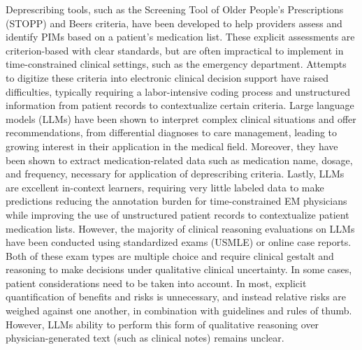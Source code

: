 Deprescribing tools, such as the Screening Tool of Older People’s Prescriptions (STOPP) and Beers criteria, have been developed to help providers assess and identify PIMs based on a patient’s medication list\citep{candeiasPotentiallyInappropriateMedications2021,bythe2023americangeriatricssocietybeerscriteriarupdateexpertpanelAmericanGeriatricsSociety2023,kaufmannInappropriatePrescribingSystematic2014}. These explicit assessments are criterion-based with clear standards, but are often impractical to implement in time-constrained clinical settings, such as the emergency department\citep{leeChallengesOpportunitiesCreating2022}. Attempts to digitize these criteria into electronic clinical decision support have raised difficulties, typically requiring a labor-intensive coding process and unstructured information from patient records to contextualize certain criteria\citep{anrysSTOPPSTARTVersion2016b,scottUsingEMRenabledComputerized2018}. Large language models (LLMs) have been shown to interpret complex clinical situations and offer recommendations, from differential diagnoses to care management, leading to growing interest in their application in the medical field\citep{clusmannFutureLandscapeLarge2023, gilsonHowDoesChatGPT2023, kungPerformanceChatGPTUSMLE2023, savageDiagnosticReasoningPrompts2024}. Moreover, they have been shown to extract medication-related data such as medication name, dosage, and frequency, necessary for application of deprescribing criteria\citep{goelLLMsAccelerateAnnotation2023}. Lastly, LLMs are excellent in-context learners, requiring very little labeled data to make predictions\citep{agrawal-etal-2022-large} reducing the annotation burden for time-constrained EM physicians while improving the use of unstructured patient records to contextualize patient medication lists. However, the majority of clinical reasoning evaluations on LLMs have been conducted using standardized exams (USMLE) or online case reports\citep{savageDiagnosticReasoningPrompts2024, savageLargeLanguageModel2024}. Both of these exam types are multiple choice and require clinical gestalt and reasoning to make decisions under  qualitative clinical uncertainty. In some cases, patient considerations need to be taken into account. In most, explicit quantification of benefits and risks is unnecessary, and instead relative risks are weighed against one another, in combination with guidelines and rules of thumb. However, LLMs ability to perform this form of qualitative reasoning over physician-generated text (such as clinical notes) remains unclear. 

